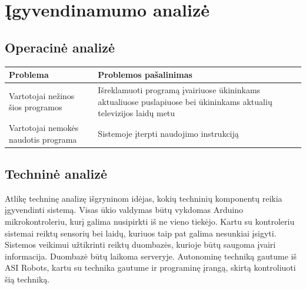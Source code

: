 \documentclass[oneside]{VUMIFPSkursinis}
\begin{document}
\section{Įgyvendinamumo analizė}
	\subsection{Operacinė analizė}
\begin{table}[htbp]
	\begin{tabularx}{1\textwidth}{ |P{7.5cm}|X| }  \hline
		Problema & Problemos pašalinimas \\ \hline
		Vartotojai nežinos šios programos & Išreklamuoti programą įvairiuose ūkininkams aktualiuose puslapiuose bei ūkininkams aktualių televizijos laidų metu \\ \hline
		Vartotojai nemokės naudotis programa & Sistemoje įterpti naudojimo instrukciją \\ \hline
	\end{tabularx}
\end{table}
	\subsection{Techninė analizė}
Atlikę techninę analizę išgryninom idėjas, kokių techninių komponentų reikia įgyvendinti sistemą. Visas ūkio valdymas būtų vykdomas Arduino mikrokontroleriu, kurį galima nusipirkti iš ne vieno tiekėjo. Kartu su kontroleriu sistemai reiktų sensorių bei laidų, kuriuos taip pat galima nesunkiai įsigyti. Sistemos veikimui užtikrinti reiktų duombazės, kurioje būtų saugoma įvairi informacija. Duombazė būtų laikoma serveryje. Autonominę techniką gautume iš ASI Robots, kartu su technika gautume ir programinę įrangą, skirtą kontroliuoti šią techniką.
\end{document}
